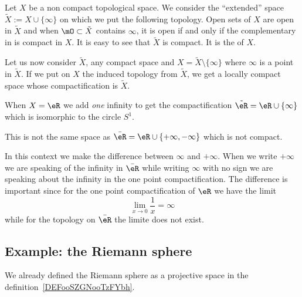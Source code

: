 \begin{definition}  \label{DEFooAKWJooWKcYav}
    Let $X$ be a non compact topological space. We consider the ``extended'' space $\tilde X:=X\cup\{ \infty\}$ on which we put the following topology. Open sets of $X$ are open in $\tilde X$ and when $\mO\subset\tilde X$ contains $\infty$, it is open if and only if the complementary in is compact in $X$. It is easy to see that $\tilde X$ is compact. It is the  of $X$.
\end{definition}

Let us now consider $\tilde X$, any compact space and $X=\tilde X\setminus\{\infty\}$ where $\infty$ is a point in $\tilde X$. If we put on $X$ the induced topology from $\tilde X$, we get a locally compact space whose compactification is $\tilde X$.

\begin{example}
    When \( X=\eR\) we add \emph{one} infinity to get the compactification \( \tilde \eR=\eR\cup\{ \infty \}\) which is isomorphic to the circle \( S^1\).

    This is not the same space as \( \bar \eR=\eR\cup\{ +\infty,-\infty \}\) which is not compact.
\end{example}

In this context we make the difference between \( \infty\) and \( +\infty\). When we write \( +\infty\) we are speaking of the infinity in \( \bar \eR\) while writing \( \infty\) with no sign we are speaking about the infinity in the one point compactification. The difference is important since for the one point compactification of \( \eR\) we have the limit
\begin{equation}
    \lim_{x\to 0} \frac{1}{ x }=\infty
\end{equation}
while for the topology on \( \bar \eR\) the limite does not exist.

\subsection{Example: the Riemann sphere}
\label{SEBSECooLJSEooNlyFYv}

We already defined the Riemann sphere as a projective space in the definition~\ref{DEFooSZGNooTzFYbh}.

